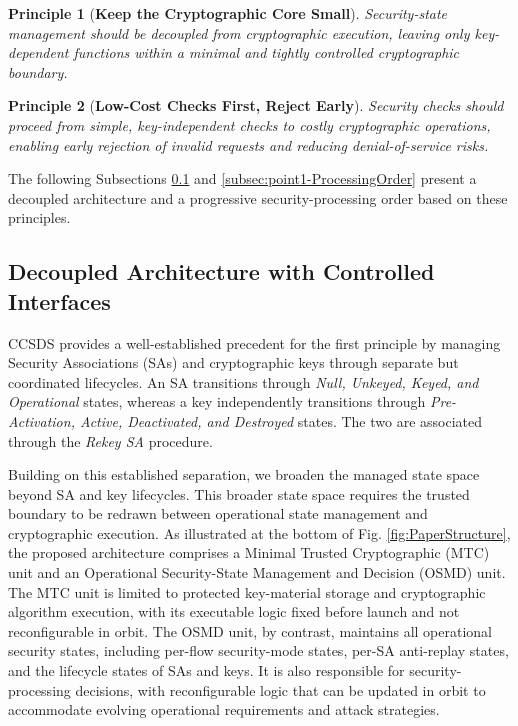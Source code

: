 \documentclass[journal]{IEEEtran}
\newtheorem{principle}{Principle}
\begin{document}
\begin{principle}[\textbf{Keep the Cryptographic Core Small}]
\label{principle:1}
Security-state management should be decoupled from cryptographic execution, leaving only key-dependent functions within a minimal and tightly controlled cryptographic boundary.
\end{principle}

\begin{principle}[\textbf{Low-Cost Checks First, Reject Early}]
\label{principle:2}
Security checks should proceed from simple, key-independent checks to costly cryptographic operations, enabling early rejection of invalid requests and reducing denial-of-service risks.
\end{principle}

The following Subsections \ref{subsec:point1-DecoupledStructure} and \ref{subsec:point1-ProcessingOrder} present a decoupled architecture and a progressive security-processing order based on these principles. 

\subsection{Decoupled Architecture with Controlled Interfaces}
\label{subsec:point1-DecoupledStructure}

CCSDS \cite{ccsds2020sdlsep} provides a well-established precedent for the first principle by managing Security Associations (SAs) and cryptographic keys through separate but coordinated lifecycles.
An SA transitions through \textit{Null, Unkeyed, Keyed, and Operational} states, whereas a key independently transitions through \textit{Pre-Activation, Active, Deactivated, and Destroyed} states.
The two are associated through the \textit{Rekey SA} procedure.

Building on this established separation, we broaden the managed state space beyond SA and key lifecycles.
This broader state space requires the trusted boundary to be redrawn between operational state management and cryptographic execution. 
As illustrated at the bottom of Fig. \ref{fig:PaperStructure}, the proposed architecture comprises a Minimal Trusted Cryptographic (MTC) unit and an Operational Security-State Management and Decision (OSMD) unit.
The MTC unit is limited to protected key-material storage and cryptographic algorithm execution, with its executable logic fixed before launch and not reconfigurable in orbit.
The OSMD unit, by contrast, maintains all operational security states, including per-flow security-mode states, per-SA anti-replay states, and the lifecycle states of SAs and keys.
It is also responsible for security-processing decisions, with reconfigurable logic that can be updated in orbit to accommodate evolving operational requirements and attack strategies.
\end{document}
